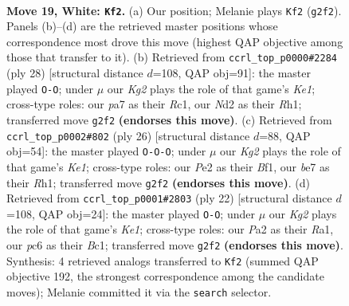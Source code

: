 \documentclass[11pt]{article}
\begin{document}
\clearpage

\begin{figure}[p]\centering
\begin{subfigure}{0.46\textwidth}\centering
\resizebox{\linewidth}{!}{%
\newchessgame
\chessboard[
  setfen={rnb1r1k1/p3b2p/2p2pp1/1p1q4/3p3P/1P1Q1PP1/P2NP1K1/RNB2R2 w - - 0 19},
  showmover=false,
  pgfstyle=straightmove, color=movearrow, markmove={g2-f2}
]}
\caption{}
\end{subfigure}\hfill
\begin{subfigure}{0.46\textwidth}\centering
\resizebox{\linewidth}{!}{%
\newchessgame
\chessboard[
  setfen={r4knr/1p1n1p1p/p2pb1p1/2q1p3/2P1P3/2NB1Q1P/PP2NPP1/2R1K2R w K - 0 15},
  showmover=false,
  pgfstyle=straightmove, color=movearrow, markmove={e1-g1}
]}
\caption{}
\end{subfigure}
\\[4pt]
\begin{subfigure}{0.46\textwidth}\centering
\resizebox{\linewidth}{!}{%
\newchessgame
\chessboard[
  setfen={r1b1k2r/1pp1bp1p/n6q/p2P1p2/2P1pP2/2N3P1/PPQ1N2P/R3KB1R w KQkq - 0 14},
  showmover=false,
  pgfstyle=straightmove, color=movearrow, markmove={e1-c1}
]}
\caption{}
\end{subfigure}\hfill
\begin{subfigure}{0.46\textwidth}\centering
\resizebox{\linewidth}{!}{%
\newchessgame
\chessboard[
  setfen={rn2kb1r/5ppp/p3pn2/3q4/1p1N4/3Q2P1/PPP1NP1P/R1B1K2R w KQkq - 0 12},
  showmover=false,
  pgfstyle=straightmove, color=movearrow, markmove={e1-g1}
]}
\caption{}
\end{subfigure}
\caption{\textbf{Move 19, White: \texttt{Kf2}.} (a) Our position; Melanie plays \texttt{Kf2} (\texttt{g2f2}). Panels (b)--(d) are the retrieved master positions whose correspondence most drove this move (highest QAP objective among those that transfer to it). (b) Retrieved from \texttt{ccrl\_top\_p0000\#2284} (ply 28) [structural distance $d$=108, QAP obj=91]: the master played \texttt{O-O}; under $\mu$ our \emph{Kg2} plays the role of that game's \emph{Ke1}; cross-type roles: our \emph{p}a7 as their \emph{R}c1, our \emph{N}d2 as their \emph{R}h1; transferred move \texttt{g2f2} \textbf{(endorses this move)}. (c) Retrieved from \texttt{ccrl\_top\_p0002\#802} (ply 26) [structural distance $d$=88, QAP obj=54]: the master played \texttt{O-O-O}; under $\mu$ our \emph{Kg2} plays the role of that game's \emph{Ke1}; cross-type roles: our \emph{P}e2 as their \emph{B}f1, our \emph{b}e7 as their \emph{R}h1; transferred move \texttt{g2f2} \textbf{(endorses this move)}. (d) Retrieved from \texttt{ccrl\_top\_p0001\#2803} (ply 22) [structural distance $d$=108, QAP obj=24]: the master played \texttt{O-O}; under $\mu$ our \emph{Kg2} plays the role of that game's \emph{Ke1}; cross-type roles: our \emph{P}a2 as their \emph{R}a1, our \emph{p}c6 as their \emph{B}c1; transferred move \texttt{g2f2} \textbf{(endorses this move)}. Synthesis: 4 retrieved analogs transferred to \texttt{Kf2} (summed QAP objective 192, the strongest correspondence among the candidate moves); Melanie committed it via the \texttt{search} selector.}
\label{fig:thought-m36}
\end{figure}
\end{document}
